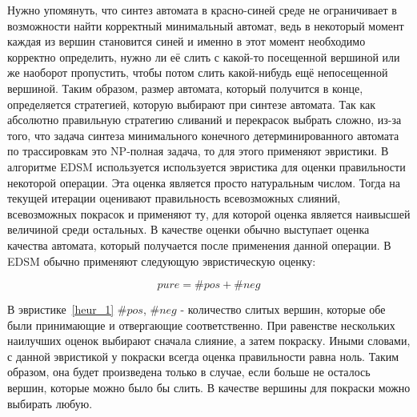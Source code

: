 \documentclass[times,specification,annotation]{itmo-student-thesis}
\begin{document}
Нужно упомянуть, что синтез автомата в красно-синей среде не ограничивает в возможности найти корректный минимальный автомат, ведь в некоторый момент каждая из вершин становится
синей и именно в этот момент необходимо корректно определить, нужно ли её слить с какой-то посещенной вершиной или же наоборот пропустить, чтобы потом слить какой-нибудь
ещё непосещенной вершиной. Таким образом, размер автомата, который получится в конце, определяется стратегией, которую выбирают при синтезе автомата.
Так как абсолютно правильную стратегию сливаний и перекрасок выбрать сложно, из-за того, что задача синтеза минимального конечного детерминированного автомата по трассировкам это
NP-полная задача, то для этого применяют эвристики. В алгоритме EDSM используется используется эвристика для оценки правильности некоторой операции. Эта оценка является просто натуральным
числом. Тогда на текущей итерации оценивают правильность всевозможных слияний, всевозможных покрасок и применяют ту, для которой оценка является наивысшей величиной среди остальных.
В качестве оценки обычно выступает оценка качества автомата, который получается после применения данной операции.
В EDSM обычно применяют следующую эвристическую оценку:

\begin{equation}
  pure = \#pos + \#neg
  \label{heur_1}
\end{equation}

В эвристике~\ref{heur_1} $\#pos$, $\#neg$ - количество слитых вершин, которые обе были принимающие и отвергающие соответственно. При равенстве нескольких наилучших оценок выбирают сначала
слияние, а затем покраску. Иными словами, с данной эвристикой у покраски всегда оценка правильности равна ноль. Таким образом, она будет произведена только в случае, 
если больше не осталось вершин, которые можно было бы слить. В качестве вершины для покраски можно выбирать любую.
\end{document}
